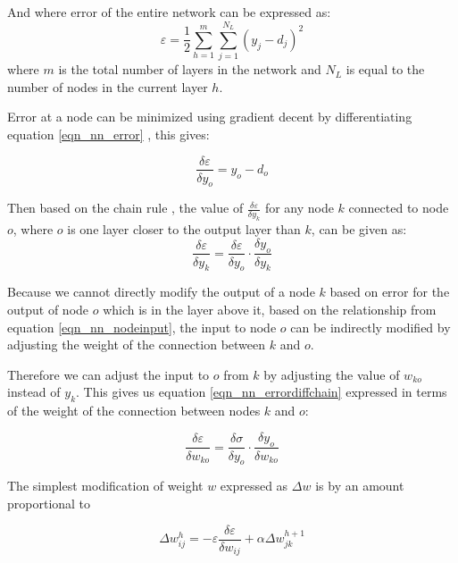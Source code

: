 \documentclass{IEEEtran}
\begin{document}
And where error of the entire network can be expressed as:
\begin{equation}
\label{eqn_nn_total error}
\varepsilon = \frac{1}{2}\sum^m_{h=1} \sum^{N_L}_{j=1} (y_j - d_j)^2
\end{equation}
where $m$ is the total number of layers in the network and $N_L$ is equal to the number of nodes in the current layer $h$.

Error at a node can be minimized using gradient decent by differentiating equation \ref{eqn_nn_error} \cite{rumelhart1988learning}, this gives:

\begin{equation}
\label{eqn_nn_errordiff}
\frac{\delta \varepsilon}{\delta y_o} = y_o - d_o
\end{equation}

Then based on the chain rule \cite{abdeljawad2015conformable}, the value of $\frac{\delta \varepsilon}{\delta y_k}$ for any node $k$ connected to node $o$, where $o$ is one layer closer to the output layer than $k$, can be given as:
\begin{equation}
\label{eqn_nn_errordiffchain}
\frac{\delta \varepsilon}{\delta y_k} = \frac{\delta \varepsilon}{\delta y_o} \cdot \frac{\delta y_o}{\delta y_k}
\end{equation}



Because we cannot directly modify the output of a node $k$ based on error for the output of node $o$ which is in the layer above it, based on the relationship from equation \ref{eqn_nn_nodeinput}, the input to node $o$ can be indirectly modified by adjusting the weight of the connection between $k$ and $o$.


Therefore we can adjust the input to $o$ from $k$ by adjusting the value of $w_{ko}$ instead of $y_k$. This gives us equation \ref{eqn_nn_errordiffchain} expressed in terms of the weight of the connection between nodes $k$ and $o$:

\begin{equation}
\label{eqn_nn_weightdiff}
\frac{\delta \varepsilon}{\delta w_{ko}} = \frac{\delta  \sigma}{\delta y_o} \cdot \frac{\delta y_o}{\delta w_{ko}}
\end{equation}

The simplest modification of weight $w$ expressed as $\Delta w$ is by an amount proportional to 

\begin{equation}
\label{eqn_nn_deltaweight}
\Delta w^h_{ij} = - \varepsilon \frac{\delta \varepsilon}{\delta w_{ij}} + \alpha \Delta w^{h+1}_{jk}
\end{equation}
\end{document}

